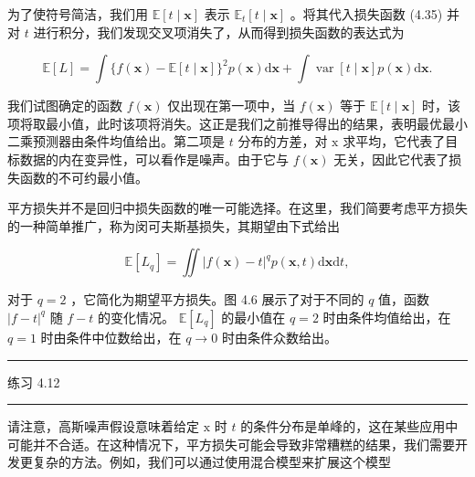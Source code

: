 \documentclass[10pt]{report}
\newcommand{\HRule}{\begin{center}\rule{0.9\linewidth}{0.2mm}\end{center}}
\begin{document}
为了使符号简洁，我们用 \(\mathbb{E}\left\lbrack  {t \mid  \mathbf{x}}\right\rbrack\) 表示 \({\mathbb{E}}_{t}\left\lbrack  {t \mid  \mathbf{x}}\right\rbrack\) 。将其代入损失函数 (4.35) 并对 \(t\) 进行积分，我们发现交叉项消失了，从而得到损失函数的表达式为

\[
\mathbb{E}\left\lbrack  L\right\rbrack   = \int \{ f\left( \mathbf{x}\right)  - \mathbb{E}\left\lbrack  {t \mid  \mathbf{x}}\right\rbrack  {\} }^{2}p\left( \mathbf{x}\right) \mathrm{d}\mathbf{x} + \int \operatorname{var}\left\lbrack  {t \mid  \mathbf{x}}\right\rbrack  p\left( \mathbf{x}\right) \mathrm{d}\mathbf{x}. \tag{4.39}
\]

我们试图确定的函数 \(f\left( \mathbf{x}\right)\) 仅出现在第一项中，当 \(f\left( \mathbf{x}\right)\) 等于 \(\mathbb{E}\left\lbrack  {t \mid  \mathbf{x}}\right\rbrack\) 时，该项将取最小值，此时该项将消失。这正是我们之前推导得出的结果，表明最优最小二乘预测器由条件均值给出。第二项是 \(t\) 分布的方差，对 \(\mathrm{x}\) 求平均，它代表了目标数据的内在变异性，可以看作是噪声。由于它与 \(f\left( \mathbf{x}\right)\) 无关，因此它代表了损失函数的不可约最小值。

平方损失并不是回归中损失函数的唯一可能选择。在这里，我们简要考虑平方损失的一种简单推广，称为闵可夫斯基损失，其期望由下式给出

\[
\mathbb{E}\left\lbrack  {L}_{q}\right\rbrack   = \iint {\left| f\left( \mathbf{x}\right)  - t\right| }^{q}p\left( {\mathbf{x},t}\right) \mathrm{d}\mathbf{x}\mathrm{d}t, \tag{4.40}
\]

对于 \(q = 2\) ，它简化为期望平方损失。图 4.6 展示了对于不同的 \(q\) 值，函数 \({\left| f - t\right| }^{q}\) 随 \(f - t\) 的变化情况。 \(\mathbb{E}\left\lbrack  {L}_{q}\right\rbrack\) 的最小值在 \(q = 2\) 时由条件均值给出，在 \(q = 1\) 时由条件中位数给出，在 \(q \rightarrow  0\) 时由条件众数给出。

\HRule

练习 4.12

\HRule

请注意，高斯噪声假设意味着给定 \(\mathrm{x}\) 时 \(t\) 的条件分布是单峰的，这在某些应用中可能并不合适。在这种情况下，平方损失可能会导致非常糟糕的结果，我们需要开发更复杂的方法。例如，我们可以通过使用混合模型来扩展这个模型
\end{document}
